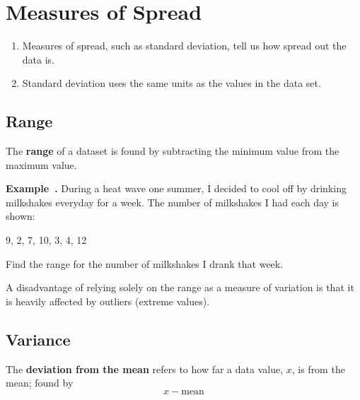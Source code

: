 \documentclass{article}
\newcounter{example}[section]
\newenvironment{example}[1][]{\refstepcounter{example}\par\medskip
   {\color{red}\textbf{Example~\theexample. #1}}}{\medskip}
\begin{document}
\section*{Measures of Spread}

\begin{tcolorbox}[colframe=orange!70!white, coltitle=black, title=\textbf{Summary}]
\begin{enumerate}
    \item Measures of spread, such as standard deviation, tell us how spread out the data is.
    \item Standard deviation uses the same units as the values in the data set.
\end{enumerate}
\end{tcolorbox}
\vspace{0.75in}

\subsection*{Range}

\begin{tcolorbox}[colframe=green!20!black, colback = green!30!white,title=\textbf{Range}]
The \textbf{range} of a dataset is found by subtracting the minimum value from the maximum value.
\end{tcolorbox}
\vspace{0.75in}

\begin{example}
During a heat wave one summer, I decided to cool off by drinking milkshakes everyday for a week. The number of milkshakes I had each day is shown:	
\begin{center}
9, 2, 7, 10, 3, 4, 12
\end{center}
Find the range for the number of milkshakes I drank that week.
\end{example}
\vspace{0.5in}

A disadvantage of relying solely on the range as a measure of variation is that it is heavily affected by outliers (extreme values).
\vspace{0.5in}

\subsection*{Variance}
\vspace{0.25in}

\begin{tcolorbox}[colframe=green!20!black, colback = green!30!white,title=\textbf{Deviation from the Mean}]
The \textbf{deviation from the mean} refers to how far a data value, $x$, is from the mean; found by \[x - \text{mean}\]
\end{tcolorbox}
\end{document}
